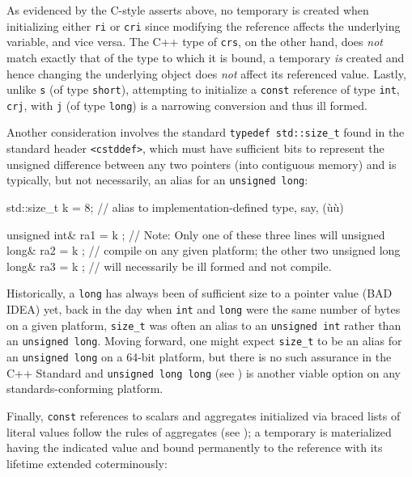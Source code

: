 \noindent As evidenced by the C-style asserts above, no temporary is created when
initializing either \lstinline!ri! or \lstinline!cri! since modifying the
reference affects the underlying variable, and vice versa. The C++ type
of \lstinline!crs!, on the other hand, does \emph{not} match exactly that
of the type to which it is bound, a temporary \emph{is} created and
hence changing the underlying object does \emph{not} affect its
referenced value. Lastly, unlike \lstinline!s! (of type \lstinline!short!),
attempting to initialize a \lstinline!const!  reference of
type \lstinline!int!, \lstinline!crj!, with \lstinline!j! (of type \lstinline!long!)
is a narrowing conversion and thus ill formed.

Another consideration involves the standard
\lstinline!typedef!~\lstinline!std::size_t! found in the standard header
\lstinline!<cstddef>!, which must have sufficient bits to represent the
unsigned difference between any two pointers (into contiguous memory)
and is typically, but not necessarily, an alias for an
\lstinline!unsigned!~\lstinline!long!:

\begin{emcppslisting}
std::size_t k = 8;  // alias to implementation-defined type, say, (ù{}ù)

unsigned int&       ra1 = { k };  // Note: Only one of these three lines will
unsigned long&      ra2 = { k };  // compile on any given platform; the other two
unsigned long long& ra3 = { k };  // will necessarily be ill formed and not compile.
\end{emcppslisting}


\noindent Historically, a \lstinline!long! has always been of sufficient size to
 a pointer value (BAD IDEA) yet, back in the day when
\lstinline!int! and \lstinline!long! were the same number of bytes on a given
platform, \lstinline!size_t! was often an alias to an
\lstinline!unsigned!~\lstinline!int! rather than an
\lstinline!unsigned!~\lstinline!long!. Moving forward, one might expect
\lstinline!size_t! to be an alias for an \lstinline!unsigned!~\lstinline!long!
on a 64-bit platform, but there is no such assurance in the C++ Standard
and \lstinline!unsigned!~\lstinline!long!~\lstinline!long! (see
) is another viable option on
any standards-conforming platform.

Finally, \lstinline!const!  references to scalars and
aggregates initialized via braced lists of literal values follow the
rules of aggregates (see ); a temporary is materialized having the indicated value and bound
permanently to the reference with its lifetime extended coterminously:

